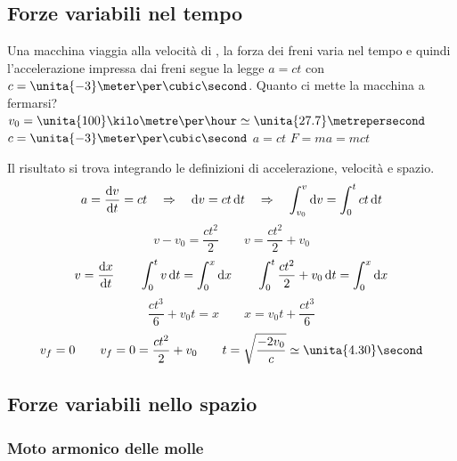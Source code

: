 \subsection{Forze variabili nel tempo}
\begin{Es}
Una macchina viaggia alla velocità di \kilo\meter\per\hour, la forza dei freni
varia nel tempo e quindi l'accelerazione impressa dai freni segue
la legge $a=ct$ con $c=\unita{-3}\meter\per\cubic\second$. Quanto ci mette la
macchina a fermarsi?
\newline
\newline $v_0=\unita{100}\kilo\metre\per\hour\simeq \unita{27.7}\metrepersecond$
\newline $c=\unita{-3}\meter\per\cubic\second$
\newline $a=ct$
\newline $F=ma=mct$

Il risultato si trova integrando le definizioni di accelerazione, velocità e spazio.
$$a=\frac{\mathrm{d} v}{\mathrm{d} t}=ct \quad \Rightarrow \quad\mathrm{d} v=ct\,\mathrm{d}
t\quad\Rightarrow\quad\int_{v_0}^v\mathrm{d} v=\int_0^t ct\,\mathrm{d} t$$
\begin{equation*}v-v_0=\frac{ct^2}{2}\qquad v=\frac{ct^2}{2}+v_0\end{equation*}
$$v=\frac{\mathrm{d} x}{\mathrm{d} t}\qquad\int_0^t v\,\mathrm{d} t=\int_0^x\mathrm{d}
x\qquad\int_0^t\frac{ct^2}{2}+v_0\,\mathrm{d} t=\int_0^x\mathrm{d} x$$
\begin{equation*}\frac{ct^3}{6}+v_0t=x\qquad x=v_0t+\frac{ct^3}{6}\end{equation*}
$$v_f=0\qquad v_f=0=\frac{ct^2}{2}+v_0\qquad
t=\sqrt{\frac{-2v_0}{c}}\simeq \unita{4.30}\second$$
\end{Es}

\subsection{Forze variabili nello spazio}
\subsubsection{Moto armonico delle molle}
\label{armonico}

